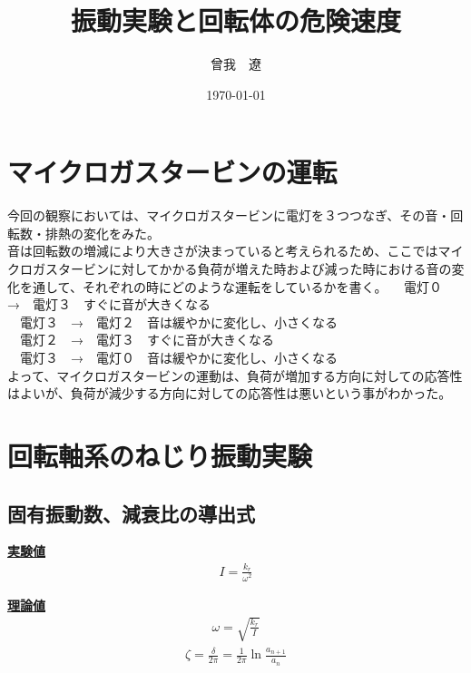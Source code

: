 \documentclass{jsarticle}
\title{振動実験と回転体の危険速度}
\author{曾我　遼}
\date{\today}
\begin{document}
\maketitle

\tableofcontents


\newpage
 \section{マイクロガスタービンの運転}
 今回の観察においては、マイクロガスタービンに電灯を３つつなぎ、その音・回転数・排熱の変化をみた。\\
 音は回転数の増減により大きさが決まっていると考えられるため、ここではマイクロガスタービンに対してかかる負荷が増えた時および減った時における音の変化を通して、それぞれの時にどのような運転をしているかを書く。
　電灯０　→　電灯３　すぐに音が大きくなる\\
　電灯３　→　電灯２　音は緩やかに変化し、小さくなる\\
　電灯２　→　電灯３　すぐに音が大きくなる\\
　電灯３　→　電灯０　音は緩やかに変化し、小さくなる\\
 よって、マイクロガスタービンの運動は、負荷が増加する方向に対しての応答性はよいが、負荷が減少する方向に対しての応答性は悪いという事がわかった。

 \section{回転軸系のねじり振動実験}
  \subsection{固有振動数、減衰比の導出式}
  \underline{\textbf{実験値}}\\
  \begin{eqnarray}
   I=\frac{k_{r}}{\omega^2}
  \end{eqnarray}
  
  \underline{\textbf{理論値}}\\
  \begin{eqnarray}
   \omega=\sqrt{\frac{k_{r}}{I}}
  \end{eqnarray}
  \begin{eqnarray}
   \zeta=\frac{\delta}{2\pi}=\frac{1}{2\pi}\ln{\frac{a_{n+1}}{a_{n}}}
  \end{eqnarray}
\end{document}
